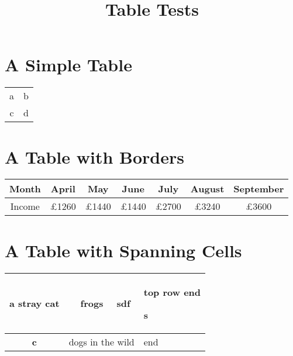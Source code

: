 \documentclass{article}
\title{Table Tests}
\begin{document}
\section{A Simple Table}

\begin{tabular}{cc}
a & b \\
c & d
\end{tabular}

\section{A Table with Borders}

\begin{tabular}{|c| c c c c c c|}
\hline Month & April & May & June & July & August & September  \\ \hline
 Income & \pounds  1260 & \pounds  1440 & \pounds  1440 & \pounds  2700 & \pounds  3240 & \pounds  3600 \\ \hline
\end{tabular}

\section{A Table with Spanning Cells}

\begin{tabular}{crcl}
\hline
a stray cat & frogs & sdf & top row end

s \\
\hline
\textbf{c} & \multicolumn{2}{c}{dogs in the wild} & end \\
\hline
\end{tabular}
\end{document}

